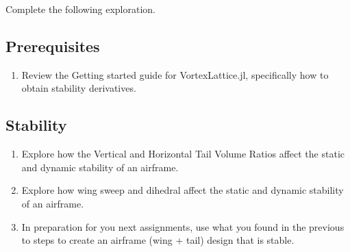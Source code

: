\documentclass[11pt]{article}
\begin{document}
Complete the following exploration.

\subsection{Prerequisites}
\label{ssec:prereqs}

\begin{enumerate}[label=\roman*.]
	\item Review the Getting started guide for VortexLattice.jl, specifically how to obtain stability derivatives. 
\end{enumerate}



\subsection{Stability}

\begin{enumerate}[label=\roman*.]
	\item Explore how the Vertical and Horizontal Tail Volume Ratios affect the static and dynamic stability of an airframe.
	\item Explore how wing sweep and dihedral affect the static and dynamic stability of an airframe.
	\item In preparation for you next assignments, use what you found in the previous to steps to create an airframe (wing + tail) design that is stable.
\end{enumerate}
\end{document}
